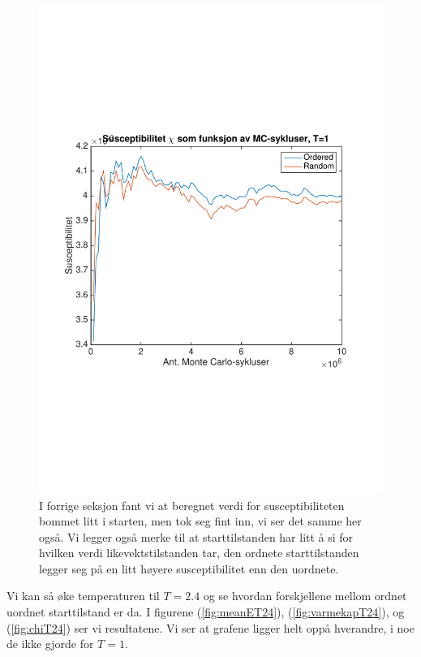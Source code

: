 \documentclass[norsk, 10pt]{article}
\begin{document}
\begin{figure}[H]
\centering
\includegraphics[scale = 0.6, trim = 1cm 8cm 1cm 8cm]{b_chi_MC_L2_T1.pdf}
\caption{I forrige seksjon fant vi at beregnet verdi for susceptibiliteten bommet litt i starten, men tok seg fint inn, vi ser det samme her også. Vi legger også merke til at starttilstanden har litt å si for hvilken verdi likevektstilstanden tar, den ordnete starttilstanden legger seg på en litt høyere susceptibilitet enn den uordnete.}
\label{fig:chiT1}
\end{figure}

Vi kan så øke temperaturen til $T=2.4$ og se hvordan forskjellene mellom ordnet uordnet starttilstand er da. I figurene (\ref{fig:meanET24}), (\ref{fig:varmekapT24}), og (\ref{fig:chiT24}) ser vi resultatene. Vi ser at grafene ligger helt oppå hverandre, i noe de ikke gjorde for $T=1$.
\end{document}
